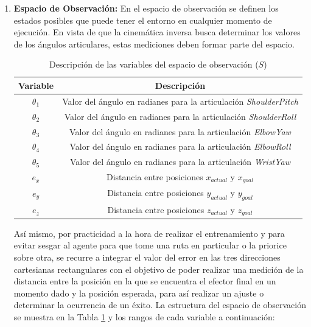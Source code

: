 \begin{enumerate}
	\item \textbf{Espacio de Observación: } En el espacio de observación se definen los estados posibles que puede tener el entorno en cualquier momento de ejecución. En vista de que la cinemática inversa busca determinar los valores de los ángulos articulares, estas mediciones deben formar parte del espacio. 
	
		\begin{table}[h!]
		\centering
		\caption{Descripción de las variables del espacio de observación ($S$)}
		\begin{tabular}{|c|c|}
			\hline
			\textbf{Variable} & \textbf{Descripción} \\
			\hline
			$\theta_1$ & Valor del ángulo en radianes para la articulación \textit{ShoulderPitch} \\
			\hline
			$\theta_2$ & Valor del ángulo en radianes para la articulación \textit{ShoulderRoll} \\
			\hline
			$\theta_3$ & Valor del ángulo en radianes para la articulación \textit{ElbowYaw} \\
			\hline
			$\theta_4$ & Valor del ángulo en radianes para la articulación \textit{ElbowRoll} \\
			\hline
			$\theta_5$ & Valor del ángulo en radianes para la articulación \textit{WristYaw} \\
			\hline
			$e_x$ & Distancia entre posiciones $x_{actual}$ y $x_{goal}$ \\
			\hline
			$e_y$ & Distancia entre posiciones $y_{actual}$ y $y_{goal}$ \\
			\hline
			$e_z$ & Distancia entre posiciones $z_{actual}$ y $z_{goal}$ \\
			\hline
		\end{tabular}
		\label{tab:obs_var}
	\end{table}
	
	Así mismo, por practicidad a la hora de realizar el entrenamiento y para evitar sesgar al agente para que tome una ruta en particular o la priorice sobre otra, se recurre a integrar el valor del error en las tres direcciones cartesianas rectangulares con el objetivo de poder realizar una medición de la distancia entre la posición en la que se encuentra el efector final en un momento dado y la posición esperada, para así realizar un ajuste o determinar la ocurrencia de un éxito. La estructura del espacio de observación se muestra en la Tabla \ref{tab:obs_var} y los rangos de cada variable a continuación:
	

\end{enumerate}
